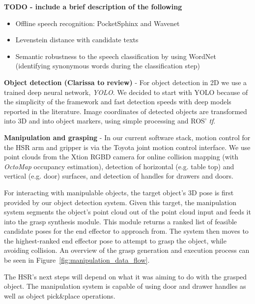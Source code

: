 \documentclass[runningheads,a4paper]{llncs}
\begin{document}
\textbf{TODO - include a brief description of the following}
\begin{itemize}
	\item Offline speech recognition: PocketSphinx and Wavenet
	\item Levenstein distance with candidate texts
	\item Semantic robustness to the speech classification by using WordNet (identifying synonymous words during the classification step)
\end{itemize}

\textbf{Object detection (Clarissa to review)} - For object detection in 2D we use a trained deep neural network, \textit{YOLO}. We decided to start with YOLO because of the simplicity of the framework and fast detection speeds with deep models reported in the literature. Image coordinates of detected objects are transformed into 3D  and into object markers, using simple processing and ROS' \textit{tf}.  

\textbf{Manipulation and grasping} - In our current software stack, motion control for the HSR arm and gripper is via the Toyota joint motion control interface.
%
We use point clouds from the Xtion RGBD camera for online collision mapping (with \textit{OctoMap} occupancy estimation), detection of horizontal (e.g. table top) and vertical (e.g. door) surfaces, and detection of handles for drawers and doors.

For interacting with manipulable objects, the target object's 3D pose is first provided by our object detection system. 
%
Given this target, the manipulation system segments the object's point cloud out of the point cloud input and feeds it into the grasp synthesis module.
%
This module returns a ranked list of feasible candidate poses for the end effector to approach from.
%
The system then moves to the highest-ranked end effector pose to attempt to grasp the object, while avoiding collision.
%
An overview of the grasp generation and execution process can be seen in Figure~\ref{fig:manipulation_data_flow}.

The HSR's next steps will depend on what it was aiming to do with the grasped object.
%
The manipulation system is capable of using door and drawer handles as well as object pick\&place operations.
\end{document}
